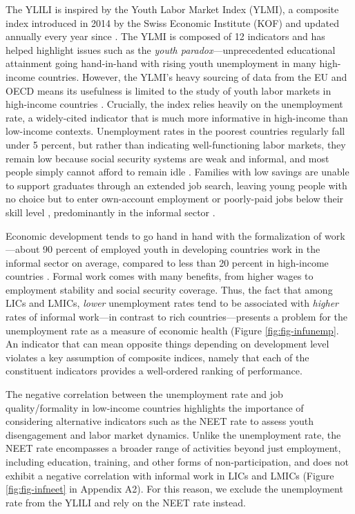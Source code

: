 \documentclass[
  a4paper, twoside, 12pt]{book}
\renewcommand{\hl}[1]{#1}
\begin{document}
The YLILI is inspired by the Youth Labor Market Index (YLMI), a composite index introduced in 2014 by the Swiss Economic Institute (KOF) and updated annually every year since \autocite{renold2014}. The YLMI is composed of 12 indicators and has helped highlight issues such as the \emph{youth paradox}---unprecedented educational attainment going hand-in-hand with rising youth unemployment in many high-income countries. However, the YLMI's heavy sourcing of data from the EU and OECD means its usefulness is limited to the study of youth labor markets in high-income countries \autocite{pusterla2015,pusterla2016}. Crucially, the index relies heavily on the unemployment rate, a widely-cited indicator that is much more informative in high-income than low-income contexts. Unemployment rates in the poorest countries regularly fall under 5 percent, but rather than indicating well-functioning labor markets, they remain low because social security systems are weak and informal, and most people simply cannot afford to remain idle \autocite{filmer2014}. Families with low savings are unable to support graduates through an extended job search, leaving young people with no choice but to enter own-account employment or poorly-paid jobs below their skill level \autocite[margolis2014]{fields2012}, predominantly in the informal sector \autocite{herrera2013,sengenberger2011}.

Economic development tends to go hand in hand with the formalization of work \autocite{laporta2014}---about 90 percent of employed youth in developing countries work in the informal sector on average, compared to less than 20 percent in high-income countries \autocite{bonnet2018}. Formal work comes with many benefits, from higher wages to employment stability and social security coverage. Thus, the fact that among LICs and LMICs, \emph{lower} unemployment rates tend to be associated with \emph{higher} rates of informal work---in contrast to rich countries---presents a problem for the unemployment rate as a measure of economic health (Figure \ref{fig:fig-infunemp}. An indicator that can mean opposite things depending on development level violates a key assumption of composite indices, namely that each of the constituent indicators provides a well-ordered ranking of performance.

\hl{The negative correlation between the unemployment rate and job quality/formality in low-income countries highlights the importance of considering alternative indicators such as the NEET rate to assess youth disengagement and labor market dynamics. Unlike the unemployment rate, the NEET rate encompasses a broader range of activities beyond just employment, including education, training, and other forms of non-participation, and does not exhibit a negative correlation with informal work in LICs and LMICs (Figure }\ref{fig:fig-infneet} \hl{in Appendix A2). For this reason, we exclude the unemployment rate from the YLILI and rely on the NEET rate instead.}
\end{document}

